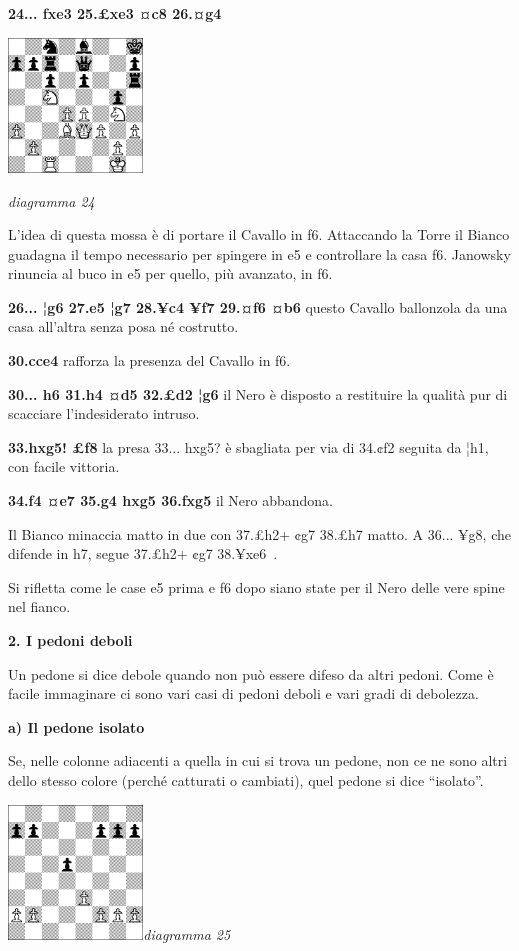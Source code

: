 \documentclass[
]{article}
\begin{document}
\textbf{24... fxe3 25.£xe3 ¤c8 26.¤g4}

\includegraphics[width=1.40972in,height=1.40972in]{vertopal_109f12be458a423d8f3cc838880eaea2/media/image24.png}

\emph{diagramma 24}

L'idea di questa mossa è di portare il Cavallo in f6. Attaccando la
Torre il Bianco guadagna il tempo necessario per spingere in e5 e
controllare la casa f6. Janowsky rinuncia al buco in e5 per quello, più
avanzato, in f6.

\textbf{26... ¦g6 27.e5 ¦g7 28.¥c4 ¥f7 29.¤f6 ¤b6} questo Cavallo
ballonzola da una casa all'altra senza posa né costrutto.

\textbf{30.cce4} rafforza la presenza del Cavallo in f6.

\textbf{30... h6 31.h4 ¤d5 32.£d2 ¦g6} il Nero è disposto a restituire
la qualità pur di scacciare l'indesiderato intruso.

\textbf{33.hxg5! £f8} la presa 33... hxg5? è sbagliata per via di 34.¢f2
seguita da ¦h1, con facile vittoria.

\textbf{34.f4 ¤e7 35.g4 hxg5 36.fxg5} il Nero abbandona.

Il Bianco minaccia matto in due con 37.£h2+ ¢g7 38.£h7 matto. A 36...
¥g8, che difende in h7, segue 37.£h2+ ¢g7 38.¥xe6~.

Si rifletta come le case e5 prima e f6 dopo siano state per il Nero
delle vere spine nel fianco.

\textbf{2. I pedoni deboli}

Un pedone si dice debole quando non può essere difeso da altri pedoni.
Come è facile immaginare ci sono vari casi di pedoni deboli e vari gradi
di debolezza.

\textbf{a) Il pedone isolato}

Se, nelle colonne adiacenti a quella in cui si trova un pedone, non ce
ne sono altri dello stesso colore (perché catturati o cambiati), quel
pedone si dice ``isolato''.

\includegraphics[width=1.40972in,height=1.40972in]{vertopal_109f12be458a423d8f3cc838880eaea2/media/image25.png}\emph{diagramma
25}
\end{document}
